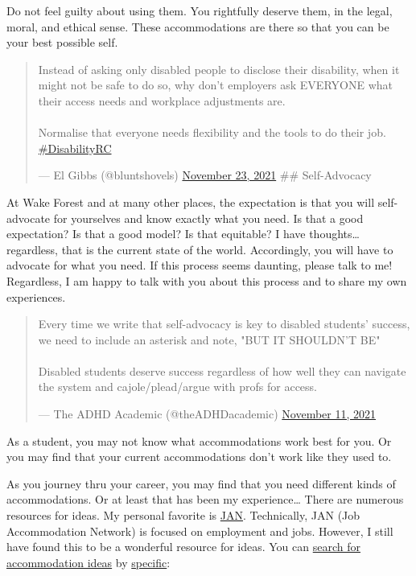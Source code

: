 \documentclass[
]{book}
\begin{document}
Do not feel guilty about using them.
You rightfully deserve them, in the legal, moral, and ethical sense.
These accommodations are there so that you can be your best possible self.

\begin{quote}
Instead of asking only disabled people to disclose their disability,
when it might not be safe to do so, why don't employers ask EVERYONE
what their access needs and workplace adjustments are.\\
~\\
Normalise that everyone needs flexibility and the tools to do their
job.
\href{https://twitter.com/hashtag/DisabilityRC}{\#DisabilityRC}

--- El Gibbs (@bluntshovels) \href{https://twitter.com/bluntshovels/status/1463275576337129480}{November 23,
2021}
\#\# Self-Advocacy
\end{quote}

At Wake Forest and at many other places, the expectation is that you will self-advocate for yourselves and know exactly what you need. Is that a good expectation? Is that a good model? Is that equitable? I have thoughts\ldots{} regardless, that is the current state of the world. Accordingly, you will have to advocate for what you need. If this process seems daunting, please talk to me! Regardless, I am happy to talk with you about this process and to share my own experiences.

\begin{quote}
Every time we write that self-advocacy is key to disabled students'
success, we need to include an asterisk and note, "BUT IT SHOULDN'T
BE"\\
~\\
Disabled students deserve success regardless of how well they can
navigate the system and cajole/plead/argue with profs for access.

--- The ADHD Academic (@theADHDacademic) \href{https://twitter.com/theADHDacademic/status/1458876178580881410}{November 11,
2021}
\end{quote}

As a student, you may not know what accommodations work best for you. Or you may find that your current accommodations don't work like they used to.

As you journey thru your career, you may find that you need different kinds of accommodations. Or at least that has been my experience\ldots{} There are numerous resources for ideas.
My personal favorite is \href{https://askjan.org/}{JAN}. Technically, JAN (Job Accommodation Network) is focused on employment and jobs.
However, I still have found this to be a wonderful resource for ideas.
You can \href{https://askjan.org/soar.cfm}{search for accommodation ideas} by \href{https://askjan.org/a-to-z.cfm}{specific}:
\end{document}
